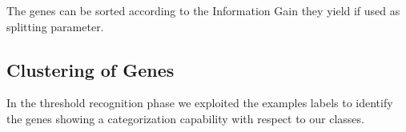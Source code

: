         The genes can be sorted according to the Information Gain they
        yield if used as splitting parameter.

\subsection{ Clustering of Genes } \label{sub:Clustering}

    In the threshold recognition phase we exploited the examples labels to
    identify the genes showing a categorization capability with respect to
    our classes.

